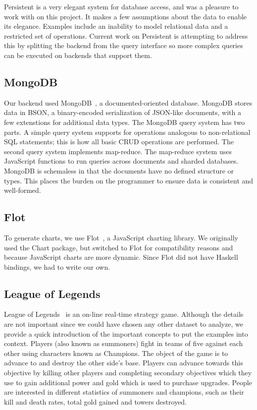 \documentclass[letterpaper,twocolumn,9pt]{article}
\begin{document}
Persistent is a very elegant system for database access, and was a pleasure to work with on this project.  It makes a few assumptions about the data to enable its elegance.  Examples include an inability to model relational data and a restricted set of operations.  Current work on Persistent is attempting to address this by splitting the backend from the query interface so more complex queries can be executed on backends that support them.

\subsection{MongoDB}

Our backend used MongoDB~\cite{mongo}, a documented-oriented database. MongoDB stores data in BSON, a binary-encoded serialization of JSON-like documents, with a few extenstions for additional data types.  The MongoDB query system has two parts.  A simple query system supports for operations analogous to non-relational SQL statements; this is how all basic CRUD operations are performed.  The second query system implements map-reduce.  The map-reduce system uses JavaScript functions to run queries across documents and sharded databases.  MongoDB is schemaless in that the documents have no defined structure or types.  This places the burden on the programmer to ensure data is consistent and well-formed.

\subsection{Flot}

To generate charts, we use Flot~\cite{flot}, a JavaScript charting library. We originally used the Chart package, but switched to Flot for compatibility reasons and because JavaScript charts are more dynamic. Since Flot did not have Haskell bindings, we had to write our own.

\subsection{League of Legends}

League of Legends~\cite{lol} is an on-line real-time strategy game. Although the details are not important since we could have chosen any other dataset to analyze, we provide a quick introduction of the important concepts to put the examples into context. Players (also known as summoners) fight in teams of five against each other using characters known as Champions. The object of the game is to advance to and destroy the other side's base. Players can advance towards this objective by killing other players and completing secondary objectives which they use to gain additional power and gold which is used to purchase upgrades. People are interested in different statistics of summoners and champions, such as their kill and death rates, total gold gained and towers destroyed.
\end{document}
